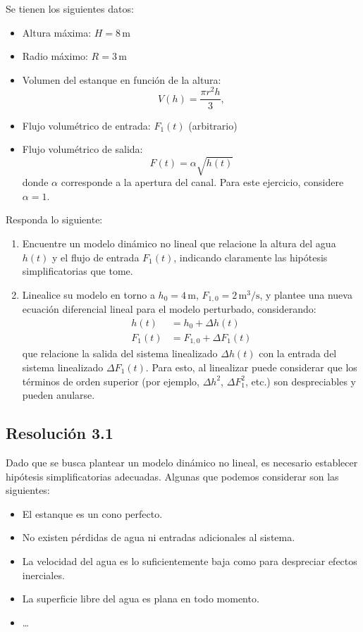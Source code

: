 \documentclass[
  11pt,
  letterpaper,
   addpoints,
   answers
  ]{exam}
\begin{document}
\begin{questions}
Se tienen los siguientes datos:
\begin{itemize}
    \item Altura máxima: $H = 8 \, \text{m}$
    \item Radio máximo: $R = 3 \, \text{m}$
    \item Volumen del estanque en función de la altura:
    \begin{equation}
        V(h) = \frac{\pi r^2 h}{3}, \tag{1}
    \end{equation}
    \item Flujo volumétrico de entrada: $F_1(t)$ (arbitrario)
    \item Flujo volumétrico de salida:
    \begin{equation}
        F(t) = \alpha \sqrt{h(t)}
    \end{equation}
    donde $\alpha$ corresponde a la apertura del canal. Para este ejercicio, considere $\alpha = 1$.
\end{itemize}

Responda lo siguiente:
\begin{enumerate}
    \item Encuentre un modelo dinámico no lineal que relacione la altura del agua $h(t)$ y el flujo de entrada $F_1(t)$, indicando claramente las hipótesis simplificatorias que tome.

    \item Linealice su modelo en torno a $h_0 = 4\,\text{m}$, $F_{1,0} = 2\,\text{m}^3/\text{s}$, y plantee una nueva ecuación diferencial lineal para el modelo perturbado, considerando:
    \begin{align*}
        h(t) &= h_0 + \Delta h(t) \\
        F_1(t) &= F_{1,0} + \Delta F_1(t)
    \end{align*}
    que relacione la salida del sistema linealizado $\Delta h(t)$ con la entrada del sistema linealizado $\Delta F_1(t)$. Para esto, al linealizar puede considerar que los términos de orden superior (por ejemplo, $\Delta h^2$, $\Delta F_1^2$, etc.) son despreciables y pueden anularse.
\end{enumerate}
\begin{solution}
\subsection*{Resolución 3.1}
Dado que se busca plantear un modelo dinámico no lineal, es necesario establecer hipótesis simplificatorias adecuadas. Algunas que podemos considerar son las siguientes:
\begin{itemize}
    \item El estanque es un cono perfecto.
    \item No existen pérdidas de agua ni entradas adicionales al sistema.
    \item La velocidad del agua es lo suficientemente baja como para despreciar efectos inerciales.
    \item La superficie libre del agua es plana en todo momento.
    \item \ldots
\end{itemize}


\end{solution}
\end{questions}
\end{document}
